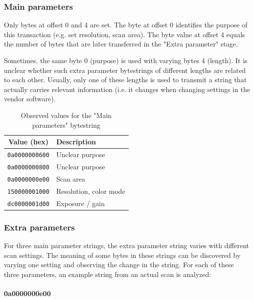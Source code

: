 \documentclass{article}
\begin{document}
\subsubsection{Main parameters}
\label{ssec:param_param}

Only bytes at offset 0 and 4 are set. The byte at offset 0 identifies the
purpose of this transaction (e.g. set resolution, scan area). The byte value at offset 4 equals
the number of bytes that are later transferred in the "Extra parameter"
stage.

Sometimes, the same byte 0 (purpose) is used with varying bytes 4 (length).
It is unclear whether such extra parameter bytestrings of different lengths
are related to each other. Usually, only one of these lengths is used to transmit
a string that actually carries relevant information (i.e. it changes when
changing settings in the vendor software).

\begin{table}[H]
  \caption{Observed values for the "Main parameters" bytestring}
  \centering
  \begin{tabular}{c | p{7cm}}
    Value (hex) & Description \\ \hline
    {\tt 0a0000000600} & Unclear purpose \\
    {\tt 0a0000000800} & Unclear purpose \\
    {\tt 0a0000000e00} & Scan area \\
    {\tt 150000001000} & Resolution, color mode \\
    {\tt dc0000001d00} & Exposure / gain \\
  \end{tabular}
\end{table}

\subsubsection{Extra parameters}
\label{ssec:param_extra}

For three main parameter strings, the extra parameter string varies
with different scan settings. The meaning of some bytes in these strings
can be discovered by varying one setting and observing the change in the
string. For each of these three parameters, an example string from an actual
scan is analyzed:

\paragraph{0a0000000e00}
\end{document}
